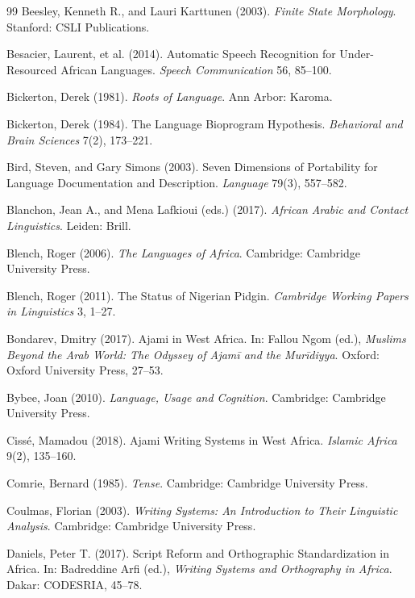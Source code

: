 \documentclass[12pt]{article}
\begin{document}
\begin{thebibliography}{99}
Beesley, Kenneth R., and Lauri Karttunen (2003).
\textit{Finite State Morphology}.
Stanford: CSLI Publications.

Besacier, Laurent, et al. (2014).
Automatic Speech Recognition for Under-Resourced African Languages.
\textit{Speech Communication} 56, 85--100.

Bickerton, Derek (1981).
\textit{Roots of Language}.
Ann Arbor: Karoma.

Bickerton, Derek (1984).
The Language Bioprogram Hypothesis.
\textit{Behavioral and Brain Sciences} 7(2), 173--221.

Bird, Steven, and Gary Simons (2003).
Seven Dimensions of Portability for Language Documentation and Description.
\textit{Language} 79(3), 557--582.

Blanchon, Jean A., and Mena Lafkioui (eds.) (2017).
\textit{African Arabic and Contact Linguistics}.
Leiden: Brill.

Blench, Roger (2006).
\textit{The Languages of Africa}.
Cambridge: Cambridge University Press.

Blench, Roger (2011).
The Status of Nigerian Pidgin.
\textit{Cambridge Working Papers in Linguistics} 3, 1--27.

Bondarev, Dmitry (2017).
Ajami in West Africa.
In: Fallou Ngom (ed.),
\textit{Muslims Beyond the Arab World: The Odyssey of \textit{Ajam\={i}} and the Mur\={i}diyya}.
Oxford: Oxford University Press, 27--53.

Bybee, Joan (2010).
\textit{Language, Usage and Cognition}.
Cambridge: Cambridge University Press.

Cissé, Mamadou (2018).
Ajami Writing Systems in West Africa.
\textit{Islamic Africa} 9(2), 135--160.

Comrie, Bernard (1985).
\textit{Tense}.
Cambridge: Cambridge University Press.

Coulmas, Florian (2003).
\textit{Writing Systems: An Introduction to Their Linguistic Analysis}.
Cambridge: Cambridge University Press.

Daniels, Peter T. (2017).
Script Reform and Orthographic Standardization in Africa.
In: Badreddine Arfi (ed.),
\textit{Writing Systems and Orthography in Africa}.
Dakar: CODESRIA, 45--78.


\end{thebibliography}
\end{document}
